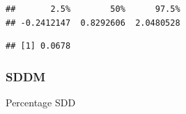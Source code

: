 \documentclass[
]{article}
\newenvironment{Shaded}{\begin{snugshade}}{\end{snugshade}}
\newcommand{\CommentTok}[1]{\textcolor[rgb]{0.56,0.35,0.01}{\textit{#1}}}
\newcommand{\DecValTok}[1]{\textcolor[rgb]{0.00,0.00,0.81}{#1}}
\newcommand{\FunctionTok}[1]{\textcolor[rgb]{0.00,0.00,0.00}{#1}}
\newcommand{\NormalTok}[1]{#1}
\newcommand{\SpecialCharTok}[1]{\textcolor[rgb]{0.00,0.00,0.00}{#1}}
\begin{document}
\begin{verbatim}
##       2.5%        50%      97.5% 
## -0.2412147  0.8292606  2.0480528
\end{verbatim}

\begin{Shaded}
\end{Shaded}

\begin{verbatim}
## [1] 0.0678
\end{verbatim}

\hypertarget{sddm}{%
\subsubsection{SDDM}\label{sddm}}

Percentage SDD
\end{document}
